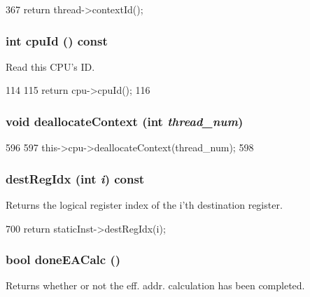 \begin{DoxyCode}
367 { return thread->contextId(); }
\end{DoxyCode}
\hypertarget{classInOrderDynInst_a1e2d18ebf4e21f2416c21a8b072e2c7b}{
\subsubsection[{cpuId}]{\setlength{\rightskip}{0pt plus 5cm}int cpuId () const}}
\label{classInOrderDynInst_a1e2d18ebf4e21f2416c21a8b072e2c7b}
Read this CPU's ID. 


\begin{DoxyCode}
114 {
115     return cpu->cpuId();
116 }
\end{DoxyCode}
\hypertarget{classInOrderDynInst_a93a6a65bef6878be7213d191e3d3c064}{
\subsubsection[{deallocateContext}]{\setlength{\rightskip}{0pt plus 5cm}void deallocateContext (int {\em thread\_\-num})}}
\label{classInOrderDynInst_a93a6a65bef6878be7213d191e3d3c064}



\begin{DoxyCode}
596 {
597     this->cpu->deallocateContext(thread_num);
598 }
\end{DoxyCode}
\hypertarget{classInOrderDynInst_ae5a1a6d72f40f715253b91e32b3caad2}{
\subsubsection[{destRegIdx}]{ destRegIdx (int {\em i}) const}}
\label{classInOrderDynInst_ae5a1a6d72f40f715253b91e32b3caad2}
Returns the logical register index of the i'th destination register. 


\begin{DoxyCode}
700 { return staticInst->destRegIdx(i); }
\end{DoxyCode}
\hypertarget{classInOrderDynInst_a2f1c9119ee950f8afc730ea9d6e92d84}{
\subsubsection[{doneEACalc}]{\setlength{\rightskip}{0pt plus 5cm}bool doneEACalc ()}}
\label{classInOrderDynInst_a2f1c9119ee950f8afc730ea9d6e92d84}
Returns whether or not the eff. addr. calculation has been completed. 


